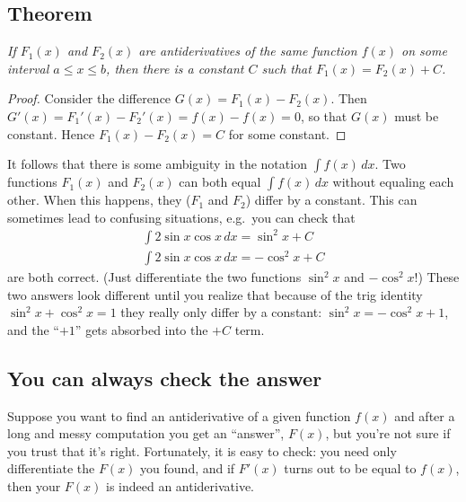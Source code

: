 \subsection*{Theorem} %
\itshape
If $F_1 (x)$ and $F_2 (x)$ are antiderivatives of the same function
$f(x)$ on some interval $a\leq x\leq b$, then there is a constant $C$
such that $F_1 (x)=F_2 (x)+C$.\upshape

\begin{proof}
  Consider the difference $G(x)=F_1(x)-F_2(x)$. Then $G'(x) =
  F_1'(x)-F_2'(x)=f(x)-f(x)=0$, so that $G(x)$ must be constant. Hence
  $F_1(x)-F_2(x)=C$ for some constant.
\end{proof}

It follows that there is some ambiguity in the notation $\int f(x)\, d
x$. Two functions $F_1(x)$ and $F_2(x)$ can both equal $\int f(x)\, d
x$ without equaling each other. When this happens, they ($F_1$ and
$F_2$) differ by a constant. This can sometimes lead to confusing
situations, e.g.\ you can check that
\begin{gather*}
  \int 2\sin x\cos x\, d x = \sin^2 x + C\\
  \int 2\sin x\cos x\, d x = -\cos^2 x + C
\end{gather*}
are both correct. (Just differentiate the two functions $\sin^2x$ and
$-\cos^2x$!) These two answers look different until you realize that
because of the trig identity $\sin^2 x+\cos^2x=1$ they really only
differ by a constant: $\sin^2x= -\cos^2x+1$, and the ``$+1$'' gets absorbed into the $+C$ term.


\begin{center}
\end{center}


\subsection{You can always check the answer} %
\label{sec:you-can-always}
Suppose you want to find an antiderivative of a given function $f(x)$
and after a long and messy computation
you get an ``answer'', $F(x)$, but you're not sure if you trust that it's right. Fortunately, it is easy to check: you need only differentiate the $F(x)$ you found, and if $F'(x)$
turns out to be equal to $f(x)$, then your $F(x)$ is indeed an
antiderivative.

